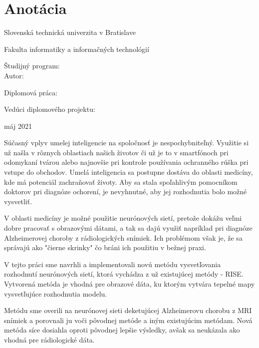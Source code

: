 
\thispagestyle{empty}
\section*{Anotácia}

\begin{minipage}[t]{1\columnwidth}%
Slovenská technická univerzita v Bratislave

Fakulta informatiky a informačných technológií

Študijný program: \myStudyProgram\\

Autor: \myName

Diplomová práca: \myTitle

Vedúci diplomového projektu: \mySupervisor

máj 2021
\end{minipage}

\bigskip{}

Súčasný vplyv umelej inteligencie na spoločnosť je nespochybniteľný. Využitie si už našla v rôznych oblastiach našich životov či už je to v smartfónoch pri odomykaní tvárou alebo najnovšie pri kontrole používania ochranného rúška pri vstupe do obchodov. Umelá inteligencia sa postupne dostáva do oblasti medicíny, kde má potenciál zachraňovať životy. Aby sa stala spoľahlivým pomocníkom doktorov pri diagnóze ochorení, je nevyhnutné, aby jej rozhodnutia bolo možné vysvetliť. 

V oblasti medicíny je možné použitie neurónových sietí, pretože dokážu veľmi dobre pracovať s obrazovými dátami, a tak sa dajú využiť napríklad pri diagnóze Alzheimerovej choroby z rádiologických snímiek. Ich problémom však je, že sa správajú ako "čierne skrinky" čo bráni ich použitiu v bežnej praxi.

V tejto práci sme navrhli a implementovali novú metódu vysvetľovania rozhodnutí neurónových sietí, ktorá vychádza z už existujúcej metódy - RISE. Vytvorená metóda je vhodná pre obrazové dáta, ku ktorým vytvára tepelné mapy vysvetľujúce rozhodnutia modelu.

Metódu sme overili na neurónovej sieti deketujúcej Alzheimerovu chorobu z MRI snímiek a porovnali ju voči pôvodnej metóde a iným existujúcim metódam. Nová metóda síce dosiahla oproti pôvodnej lepšie výsledky, avšak sa neukázala ako vhodná pre rádiologické dáta.

\newpage
\thispagestyle{empty}
\mbox{}
\newpage